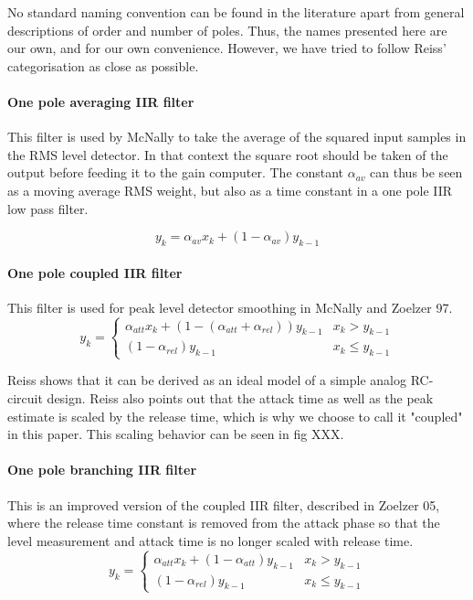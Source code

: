 \documentclass[../main2.tex]{subfiles}
\begin{document}
No standard naming convention can be found in the literature apart from general descriptions of order and number of poles. Thus, the names presented here are our own, and for our own convenience. However, we have tried to follow Reiss' categorisation as close as possible.

\paragraph{One pole averaging IIR filter}
This filter is used by McNally to take the average of the squared input samples in the RMS level detector. In that context the square root should be taken of the output before feeding it to the gain computer. The constant $\alpha_{av}$ can thus be seen as a moving average RMS weight, but also as a time constant in a one pole IIR low pass filter.

\begin{equation}
y_k = \alpha_{av}x_k + (1-\alpha_{av}) y_{k-1}
\end{equation}

\paragraph{One pole coupled IIR filter}
This filter is used for peak level detector smoothing in McNally and Zoelzer 97.
\begin{equation}
y_k = \begin{cases}
    \alpha_{att} x_k + (1- (\alpha_{att} + \alpha_{rel})) y_{k-1}  	& x_k > y_{k-1} \\
    (1-\alpha_{rel}) y_{k-1} 								& x_k \leq y_{k-1}
\end{cases}
\end{equation}

Reiss shows that it can be derived as an ideal model of a simple analog RC-circuit design. Reiss also points out that the attack time as well as the peak estimate is scaled by the release time, which is why we choose to call it "coupled" in this paper. This scaling behavior can be seen in fig XXX.

\paragraph{One pole branching IIR filter}
This is an improved version of the coupled IIR filter, described in Zoelzer 05, where the release time constant is removed from the attack phase so that the level measurement and attack time is no longer scaled with release time.
\begin{equation}
y_k = \begin{cases}
    \alpha_{att} x_k + (1-\alpha_{att}) y_{k-1} 	& x_k > y_{k-1} \\
    (1-\alpha_{rel}) y_{k-1} 					& x_k \leq y_{k-1}
\end{cases}
\end{equation}
\end{document}
